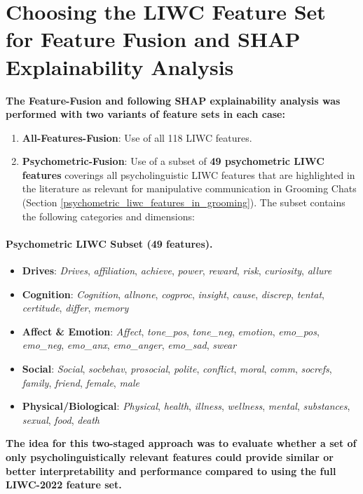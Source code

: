\section{Choosing the LIWC Feature Set for Feature Fusion and SHAP Explainability Analysis} \label{sec:liwc-feature-selection}



\textbf{The Feature-Fusion and following SHAP explainability analysis was performed with two variants of feature sets in each case: }
\begin{enumerate}
    \item \textbf{All-Features-Fusion}: Use of all 118 LIWC features.
    \item \textbf{Psychometric-Fusion}: Use of a subset of \textbf{49 psychometric LIWC features} coverings all psycholinguistic LIWC features that are highlighted in the literature as relevant for manipulative communication in Grooming Chats (Section \ref{psychometric_liwc_features_in_grooming}). The subset contains the following categories and dimensions:
\end{enumerate}

\paragraph{Psychometric LIWC Subset (49 features).}
\begin{itemize}
  \item \textbf{Drives}: \textit{Drives}, \textit{affiliation}, \textit{achieve}, \textit{power}, \textit{reward}, \textit{risk}, \textit{curiosity}, \textit{allure}
  \item \textbf{Cognition}: \textit{Cognition}, \textit{allnone}, \textit{cogproc}, \textit{insight}, \textit{cause}, \textit{discrep}, \textit{tentat}, \textit{certitude}, \textit{differ}, \textit{memory}
  \item \textbf{Affect \& Emotion}: \textit{Affect}, \textit{tone\_pos}, \textit{tone\_neg}, \textit{emotion}, \textit{emo\_pos}, \textit{emo\_neg}, \textit{emo\_anx}, \textit{emo\_anger}, \textit{emo\_sad}, \textit{swear}
  \item \textbf{Social}: \textit{Social}, \textit{socbehav}, \textit{prosocial}, \textit{polite}, \textit{conflict}, \textit{moral}, \textit{comm}, \textit{socrefs}, \textit{family}, \textit{friend}, \textit{female}, \textit{male}
  \item \textbf{Physical/Biological}: \textit{Physical}, \textit{health}, \textit{illness}, \textit{wellness}, \textit{mental}, \textit{substances}, \textit{sexual}, \textit{food}, \textit{death}
\end{itemize}
\textbf{The idea for this two-staged approach was to evaluate whether a set of only psycholinguistically relevant features could provide similar or better interpretability and performance compared to using the full LIWC-2022 feature set.} 


